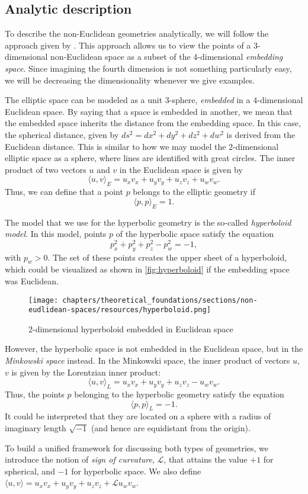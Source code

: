 \subsection{Analytic description}
To describe the non-Euclidean geometries analytically, we will follow the approach given by \cite{Szirmay-Kalos2022}.
This approach allows us to view the points of a 3-dimensional non-Euclidean space as a subset of the 4-dimensional \textit{embedding space}.
Since imagining the fourth dimension is not something particularly easy, we will be decreasing the dimensionality whenever we give examples.

The elliptic space can be modeled as a unit 3-sphere, \textit{embedded} in a 4-dimensional Euclidean space.
By saying that a space is embedded in another, we mean that the embedded space inherits the distance from the embedding space.
In this case, the spherical distance, given by $ds^2 = dx^2 + dy^2 + dz^2 + dw^2$ is derived from the Euclidean distance.
This is similar to how we may model the 2-dimensional elliptic space as a sphere, where lines are identified with great circles.
The inner product of two vectors $u$ and $v$ in the Euclidean space is given by
$$ \langle u, v \rangle_E  = u_xv_x + u_yv_y + u_zv_z + u_wv_w.$$
Thus, we can define that a point $p$ belongs to the elliptic geometry if
$$ \langle p, p \rangle_E = 1.$$

The model that we use for the hyperbolic geometry is the so-called \textit{hyperboloid model}.
In this model, points $p$ of the hyperbolic space satisfy the equation
$$p_x^2 + p_y^2 + p_z^2 - p_w^2 = -1,$$
with $p_w > 0$.
The set of these points creates the upper sheet of a hyperboloid, which could be visualized as shown in \autoref{fig:hyperboloid} if the embedding space was Euclidean.
\begin{figure}[h]
    \centering
    \texttt{[image: chapters/theoretical\_foundations/sections/non-eudlidean-spaces/resources/hyperboloid.png]}
    \caption{2-dimensional hyperboloid embedded in Euclidean space}
    \label{fig:hyperboloid}
\end{figure}
However, the hyperbolic space is not embedded in the Euclidean space, but in the \textit{Minkowski space} instead.
In the Minkowski space, the inner product of vectors $u$, $v$ is given by the Lorentzian inner product:
$$\langle u, v \rangle_L = u_xv_x + u_yv_y + u_zv_z - u_wv_w.$$
Thus, the points $p$ belonging to the hyperbolic geometry satisfy the equation
$$\langle p, p \rangle_L = -1.$$
It could be interpreted that they are located on a sphere with a radius of imaginary length $\sqrt{-1}$ (and hence are equidistant from the origin).

To build a unified framework for discussing both types of geometries, we introduce the notion of \textit{sign of curvature}, $\mathcal{L}$, that attains the value $+1$ for spherical, and $-1$ for hyperbolic space.
We also define $\langle u, v \rangle = u_xv_x + u_yv_y + u_zv_z + \mathcal{L}u_wv_w$.

